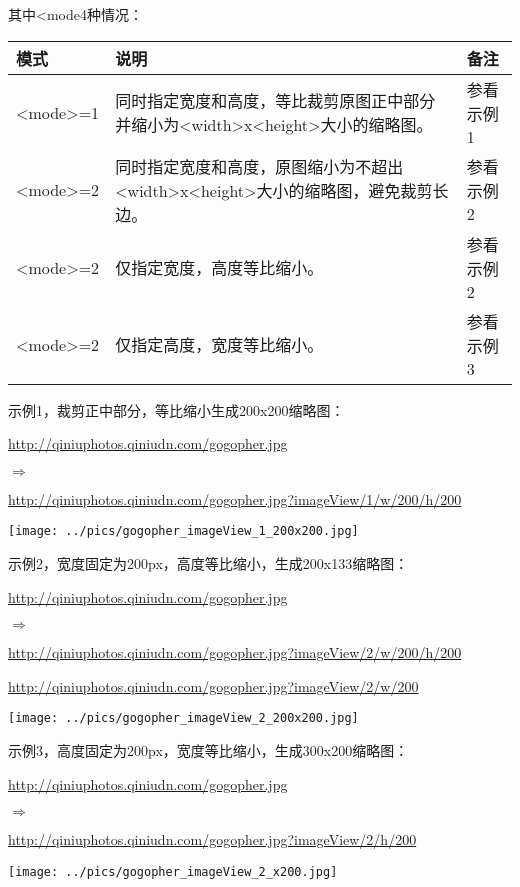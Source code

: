 \documentclass[11pt, oneside]{book}
\newcommand{\qpar}[1]{
\vspace{0.25em}
\noindent
#1\par
\vspace{0.25em}
}
\newcommand{\qurl}[1]{\url{#1}}
\newcommand{\qtable}[1]{\vspace{0.5em}#1\vspace{0.5em}}
\begin{document}
\begin{CJK*}{UTF8}{song}
\qpar{其中\textless mode4种情况：}
\qtable{
\def\arraystretch{1.5}
\begin{tabular}{|l|p{22em}|l|}
\hline
模式 & 说明 & 备注 \\
\hline
\textless mode\textgreater=1 & 同时指定宽度和高度，等比裁剪原图正中部分并缩小为\textless width\textgreater x\textless height\textgreater 大小的缩略图。& 参看示例1 \\
\hline
\textless mode\textgreater=2 & 同时指定宽度和高度，原图缩小为不超出\textless width\textgreater x\textless height\textgreater 大小的缩略图，避免裁剪长边。& 参看示例2 \\
\hline
\textless mode\textgreater=2 & 仅指定宽度，高度等比缩小。 & 参看示例2 \\
\hline
\textless mode\textgreater=2 & 仅指定高度，宽度等比缩小。 & 参看示例3 \\
\hline
\end{tabular}
}

\clearpage

\qpar{示例1，裁剪正中部分，等比缩小生成200x200缩略图：}
\qpar{\qurl{http://qiniuphotos.qiniudn.com/gogopher.jpg}}
\qpar{$\Rightarrow$}
\qpar{\qurl{http://qiniuphotos.qiniudn.com/gogopher.jpg?imageView/1/w/200/h/200}}

\begin{center}
\texttt{[image: ../pics/gogopher\_imageView\_1\_200x200.jpg]}
\end{center}

\qpar{示例2，宽度固定为200px，高度等比缩小，生成200x133缩略图：}
\qpar{\qurl{http://qiniuphotos.qiniudn.com/gogopher.jpg}}
\qpar{$\Rightarrow$}
\qpar{\qurl{http://qiniuphotos.qiniudn.com/gogopher.jpg?imageView/2/w/200/h/200}}
\qpar{\qurl{http://qiniuphotos.qiniudn.com/gogopher.jpg?imageView/2/w/200}}

\begin{center}
\texttt{[image: ../pics/gogopher\_imageView\_2\_200x200.jpg]}
\end{center}

\clearpage

\qpar{示例3，高度固定为200px，宽度等比缩小，生成300x200缩略图：}
\qpar{\qurl{http://qiniuphotos.qiniudn.com/gogopher.jpg}}
\qpar{$\Rightarrow$}
\qpar{\qurl{http://qiniuphotos.qiniudn.com/gogopher.jpg?imageView/2/h/200}}

\begin{center}
\texttt{[image: ../pics/gogopher\_imageView\_2\_x200.jpg]}
\end{center}


\end{CJK*}
\end{document}
